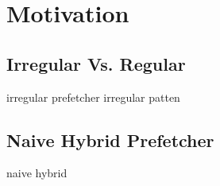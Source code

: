 \section{Motivation}
\label{sec:motivation}

  \subsection{Irregular Vs. Regular}
  \label{sec:irrVsre}
  irregular prefetcher
  irregular patten

  \subsection{Naive Hybrid Prefetcher}
  \label{sec:naivehy}
  naive hybrid
